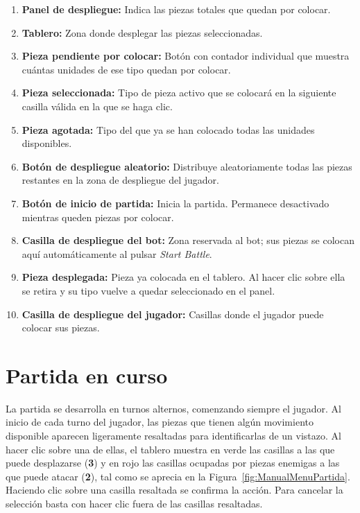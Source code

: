 \begin{enumerate}
	\item \textbf{Panel de despliegue:} Indica las piezas totales que quedan por colocar.
	\item \textbf{Tablero:} Zona donde desplegar las piezas seleccionadas.
	\item \textbf{Pieza pendiente por colocar:} Botón con contador individual que muestra cuántas unidades de ese tipo quedan por colocar.
	\item \textbf{Pieza seleccionada:} Tipo de pieza activo que se colocará en la siguiente casilla válida en la que se haga clic.
	\item \textbf{Pieza agotada:} Tipo del que ya se han colocado todas las unidades disponibles.
	\item \textbf{Botón de despliegue aleatorio:} Distribuye aleatoriamente todas las piezas restantes en la zona de despliegue del jugador.
	\item \textbf{Botón de inicio de partida:} Inicia la partida. Permanece desactivado mientras queden piezas por colocar.
	\item \textbf{Casilla de despliegue del bot:} Zona reservada al bot; sus piezas se colocan aquí automáticamente al pulsar \textit{Start Battle}.
	\item \textbf{Pieza desplegada:} Pieza ya colocada en el tablero. Al hacer clic sobre ella se retira y su tipo vuelve a quedar seleccionado en el panel.
	\item \textbf{Casilla de despliegue del jugador:} Casillas donde el jugador puede colocar sus piezas.
\end{enumerate}

\section{Partida en curso}

La partida se desarrolla en turnos alternos, comenzando siempre el jugador. Al inicio de cada turno del jugador, las piezas que tienen algún movimiento disponible aparecen ligeramente resaltadas para identificarlas de un vistazo. Al hacer clic sobre una de ellas, el tablero muestra en verde las casillas a las que puede desplazarse (\textbf{3}) y en rojo las casillas ocupadas por piezas enemigas a las que puede atacar (\textbf{2}), tal como se aprecia en la Figura~\ref{fig:ManualMenuPartida}. Haciendo clic sobre una casilla resaltada se confirma la acción. Para cancelar la selección basta con hacer clic fuera de las casillas resaltadas.


